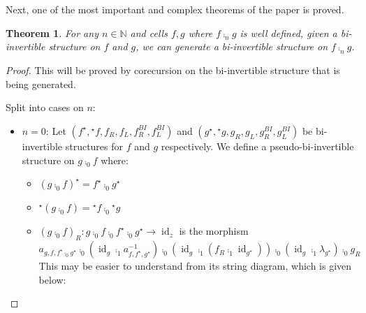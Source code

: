 \documentclass[draft]{article}
\newtheorem{theorem}{Theorem} \newtheorem{prop}[theorem]{Proposition}
\DeclareMathOperator{\id}{id}
\newcommand{\linv}[1]{{}^\star\!#1} \newcommand{\rinv}[1]{#1^\star}
\begin{document}
\noindent Next, one of the most important and complex theorems of the
paper is proved.

\begin{theorem}\label{bi-inv-composition}
  For any \(n \in \mathbb{N}\) and cells \(f,g\) where \(f \comp_n g\)
  is well defined, given a bi-invertible structure on \(f\) and \(g\),
  we can generate a bi-invertible structure on \(f \comp_n g\).
\end{theorem}
\begin{proof}
  This will be proved by corecursion on the bi-invertible structure
  that is being generated.

  Split into cases on \(n\):
  \begin{itemize}
  \item \(n = 0\): Let \((\rinv f, \linv f, f_R, f_L, f_R^{BI},
    f_L^{BI})\) and \((\rinv g, \linv g, g_R, g_L, g_R^{BI},
    g_L^{BI})\) be bi-invertible structures for \(f\) and \(g\)
    respectively. We define a pseudo-bi-invertible structure on \(g
    \comp_0 f\) where:
    \begin{itemize}
    \item \(\rinv {(g \comp_0 f)} = \rinv f \comp_0 \rinv g\)
    \item \(\linv {(g \comp_0 f)} = \linv f \comp_0 \linv g\)
    \item \({(g \comp_0 f)}_R : g \comp_0 f \comp_0 \rinv f \comp_0
      \rinv g \to \id_z\) is the morphism
      \begin{equation*}
        a_{g, f, \rinv f \comp_0 \rinv g} \comp_0 (\id_g \comp_1 a_{f,\rinv f, \rinv g}^{-1}) \comp_0 (\id_g \comp_1 (f_R \comp_1 \id_{\rinv g})) \comp_0 (\id_g \comp_1 \lambda_{\rinv g}) \comp_0 g_R
      \end{equation*}
      This may be easier to understand from its string diagram, which
      is given below:
      \begin{center}
\end{center}
\end{itemize}
\end{itemize}
\end{proof}
\end{document}
